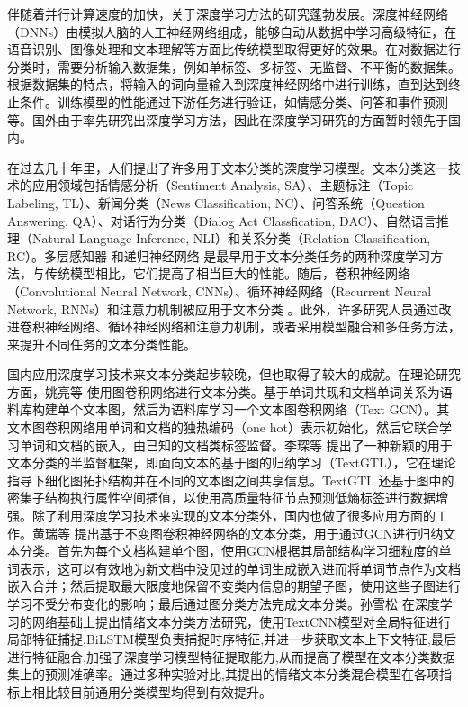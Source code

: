 
伴随着并行计算速度的加快，关于深度学习方法的研究蓬勃发展。深度神经网络（DNNs）由模拟人脑的人工神经网络组成，能够自动从数据中学习高级特征，在语音识别、图像处理和文本理解等方面比传统模型取得更好的效果。在对数据进行分类时，需要分析输入数据集，例如单标签、多标签、无监督、不平衡的数据集。根据数据集的特点，将输入的词向量输入到深度神经网络中进行训练，直到达到终止条件。训练模型的性能通过下游任务进行验证，如情感分类、问答和事件预测等。国外由于率先研究出深度学习方法，因此在深度学习研究的方面暂时领先于国内。

在过去几十年里，人们提出了许多用于文本分类的深度学习模型。文本分类这一技术的应用领域包括情感分析（Sentiment Analysis, SA）、主题标注（Topic Labeling, TL）、新闻分类（News Classification, NC）、问答系统（Question Answering, QA）、对话行为分类（Dialog Act Classfication, DAC）、自然语言推理（Natural Language Inference, NLI）和关系分类（Relation Classification, RC）。多层感知器 \cite{Alsmadi2009PerformanceCO} 和递归神经网络 \cite{10.1145/3234150} 是最早用于文本分类任务的两种深度学习方法，与传统模型相比，它们提高了相当巨大的性能。随后，卷积神经网络（Convolutional Neural Network, CNNs）、循环神经网络（Recurrent Neural Network, RNNs）和注意力机制被应用于文本分类 \cite{Zhao2018InvestigatingCN, Qin2020DCRNetAD, Deng2021HTCInfoMaxAG}。此外，许多研究人员通过改进卷积神经网络、循环神经网络和注意力机制，或者采用模型融合和多任务方法，来提升不同任务的文本分类性能。

国内应用深度学习技术来文本分类起步较晚，但也取得了较大的成就。在理论研究方面，姚亮等 \cite{Yao2018GraphCN} 使用图卷积网络进行文本分类。基于单词共现和文档单词关系为语料库构建单个文本图，然后为语料库学习一个文本图卷积网络（Text GCN）。其文本图卷积网络用单词和文档的独热编码（one hot）表示初始化，然后它联合学习单词和文档的嵌入，由已知的文档类标签监督。李琛等 \cite{Li2021TextGTLGT} 提出了一种新颖的用于文本分类的半监督框架，即面向文本的基于图的归纳学习（TextGTL），它在理论指导下细化图拓扑结构并在不同的文本图之间共享信息。TextGTL 还基于图中的密集子结构执行属性空间插值，以使用高质量特征节点预测低熵标签进行数据增强。除了利用深度学习技术来实现的文本分类外，国内也做了很多应用方面的工作。黄瑞等 \cite{JSJA2024S1014} 提出基于不变图卷积神经网络的文本分类，用于通过GCN进行归纳文本分类。首先为每个文档构建单个图，使用GCN根据其局部结构学习细粒度的单词表示，这可以有效地为新文档中没见过的单词生成嵌入进而将单词节点作为文档嵌入合并；然后提取最大限度地保留不变类内信息的期望子图，使用这些子图进行学习不受分布变化的影响；最后通过图分类方法完成文本分类。孙雪松 \cite{1024533250.nh} 在深度学习的网络基础上提出情绪文本分类方法研究，使用TextCNN模型对全局特征进行局部特征捕捉,BiLSTM模型负责捕捉时序特征,并进一步获取文本上下文特征,最后进行特征融合,加强了深度学习模型特征提取能力,从而提高了模型在文本分类数据集上的预测准确率。通过多种实验对比,其提出的情绪文本分类混合模型在各项指标上相比较目前通用分类模型均得到有效提升。

